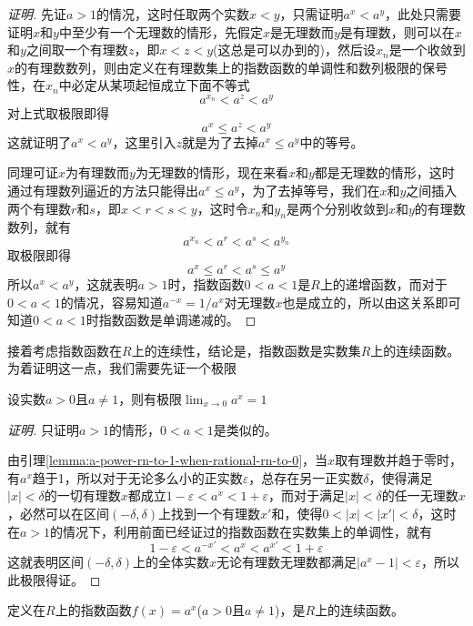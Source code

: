 \begin{proof}[证明]
  先证$a>1$的情况，这时任取两个实数$x<y$，只需证明$a^x<a^y$，此处只需要证明$x$和$y$中至少有一个无理数的情形，先假定$x$是无理数而$y$是有理数，则可以在$x$和$y$之间取一个有理数$z$，即$x<z<y$(这总是可以办到的)，然后设$x_n$是一个收敛到$x$的有理数数列，则由定义在有理数集上的指数函数的单调性和数列极限的保号性，在$x_n$中必定从某项起恒成立下面不等式
  \[ a^{x_n}<a^z<a^y \]
  对上式取极限即得
  \[ a^x \leqslant a^z < a^y \]
  这就证明了$a^x<a^y$，这里引入$z$就是为了去掉$a^x \leqslant a^y$中的等号。

  同理可证$x$为有理数而$y$为无理数的情形，现在来看$x$和$y$都是无理数的情形，这时通过有理数列逼近的方法只能得出$a^x \leqslant a^y$，为了去掉等号，我们在$x$和$y$之间插入两个有理数$r$和$s$，即$x<r<s<y$，这时令$x_n$和$y_n$是两个分别收敛到$x$和$y$的有理数数列，就有
  \[ a^{x_n} < a^r < a^s < a^{y_n} \]
  取极限即得
  \[ a^x \leqslant a^r < a^s \leqslant a^y \]
所以$a^x < a^y$，这就表明$a>1$时，指数函数$0<a<1$是$R$上的递增函数，而对于$0<a<1$的情况，容易知道$a^{-x}=1/a^x$对无理数$x$也是成立的，所以由这关系即可知道$0<a<1$时指数函数是单调递减的。
\end{proof}

接着考虑指数函数在$R$上的连续性，结论是，指数函数是实数集$R$上的连续函数。为着证明这一点，我们需要先证一个极限
\begin{lemma}
  \label{lemma:a-power-x-to-1-when-real-x-to-0}
  设实数$a>0$且$a \neq 1$，则有极限$\lim_{x \to 0} a^x = 1$
\end{lemma}

\begin{proof}[证明]
  只证明$a>1$的情形，$0<a<1$是类似的。

  由引理\autoref{lemma:a-power-rn-to-1-when-rational-rn-to-0}，当$x$取有理数并趋于零时，有$a^x$趋于1，所以对于无论多么小的正实数$\varepsilon$，总存在另一正实数$\delta$，使得满足$|x|<\delta$的一切有理数$x$都成立$1-\varepsilon<a^x<1+\varepsilon$，而对于满足$|x|<\delta$的任一无理数$x$，必然可以在区间$(-\delta,\delta)$上找到一个有理数$x'$和，使得$0<|x|<|x'|<\delta$，这时在$a>1$的情况下，利用前面已经证过的指数函数在实数集上的单调性，就有
  \[ 1-\varepsilon < a^{-x'}<a^x<a^{x'} < 1+\varepsilon \]
  这就表明区间$(-\delta,\delta)$上的全体实数$x$无论有理数无理数都满足$|a^x-1|<\varepsilon$，所以此极限得证。
\end{proof}

\begin{theorem}
  定义在$R$上的指数函数$f(x)=a^x$($a>0$且$a \neq 1$)，是$R$上的连续函数。
\end{theorem}

